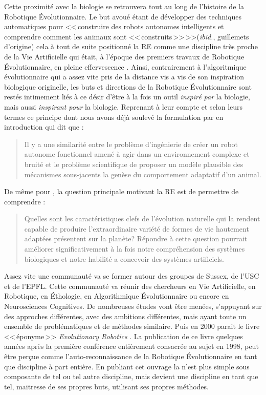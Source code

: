 Cette proximité avec la biologie se retrouvera tout au long de l'histoire de la Robotique \'Evolutionnaire. Le but avoué étant de développer des techniques automatiques pour <<\,construire des robots autonomes intelligents et comprendre comment les animaux sont <<\,construits\,>>\,>>(\emph{ibid.}, guillemets d'origine) cela à tout de suite positionné la RE comme une discipline très proche de la Vie Artificielle qui était, à l'époque des premiers travaux de Robotique \'Evolutionnaire, en pleine effervescence \citep{langton89alifeiproceedingsfirstinternationalworkshopsynthesissimulationlivingsystems}. Ainsi, contrairement à l'algoritmique évolutionnaire qui a assez vite pris de la distance vis a vis de son inspiration biologique originelle, les buts et directions de la Robotique \'Evolutionnaire sont restés intimement liés à ce désir d'être à la fois un outil \emph{inspiré par} la biologie, mais aussi \emph{inspirant pour} la biologie. Reprenant à leur compte et selon leurs termes ce principe dont nous avons déjà soulevé la formulation par \cite{maynardsmith78optimizationtheoryinevolution} en introduction qui dit que :
\begin{quotation}
   Il y a une similarité entre le problème d'ingénierie de créer un robot autonome fonctionnel amené à agir dans un environnement complexe et bruité et le problème scientifique de proposer un modèle plausible des mécanismes sous-jacents la genèse du comportement adaptatif d'un animal.\\
   \citep[p. 74]{cliff93explorationsinevolutionaryrobotics}
\end{quotation}
De même pour \citet[p. 12-13]{nolfi00evolrobobiolintetechselfmach}, la question principale motivant la RE est de permettre de comprendre :
\begin{quotation}
   Quelles sont les caractéristiques clefs de l'évolution naturelle qui la rendent capable de produire l'extraordinaire variété de formes de vie hautement adaptées présentent sur la planète? Répondre à cette question pourrait améliorer significativement à la fois notre compréhension des systèmes biologiques et notre habilité a concevoir des systèmes artificiels.
\end{quotation}

Assez vite une communauté va se former autour des groupes de Sussex, de l'USC et de l'EPFL. Cette communauté va réunir des chercheurs en Vie Artificielle, en Robotique, en \'Ethologie, en Algorithmique \'Evolutionnaire ou encore en Neurosciences Cognitives. De nombreuses études vont être menées, s'appuyant sur des approches différentes, avec des ambitions différentes, mais ayant toute un ensemble de problématiques et de méthodes similaire. Puis en 2000 parait le livre <<\,éponyme\,>> \emph{Evolutionary Robotics} \citep{nolfi00evolrobobiolintetechselfmach}. La publication de ce livre quelques années après la première conférence entièrement consacrée au sujet en 1998, peut être perçue comme l'auto-reconnaissance de la Robotique \'Evolutionnaire en tant que discipline à part entière. En publiant cet ouvrage la n'est plus simple sous composante de tel ou tel autre discipline, mais devient une discipline en tant que tel, maitresse de ses propres buts, utilisant ses propres méthodes.


